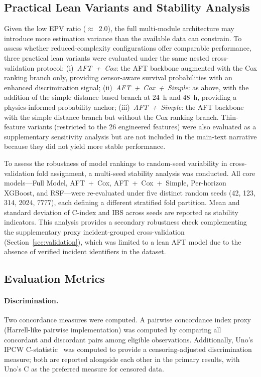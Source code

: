 \documentclass[fire,article,submit,pdftex]{../Definitions/mdpi}
\begin{document}
\subsection{Practical Lean Variants and Stability Analysis}\label{sec:lean_variants}

Given the low EPV ratio ($\approx$~2.0), the full multi-module architecture may introduce more estimation variance than the available data can constrain.
To assess whether reduced-complexity configurations offer comparable performance, three practical lean variants were evaluated under the same nested cross-validation protocol:
(i)~\emph{AFT~+~Cox}: the AFT backbone augmented with the Cox ranking branch only, providing censor-aware survival probabilities with an enhanced discrimination signal;
(ii)~\emph{AFT~+~Cox~+~Simple}: as above, with the addition of the simple distance-based branch at 24~h and 48~h, providing a physics-informed probability anchor;
(iii)~\emph{AFT~+~Simple}: the AFT backbone with the simple distance branch but without the Cox ranking branch.
Thin-feature variants (restricted to the 26 engineered features) were also evaluated as a supplementary sensitivity analysis but are not included in the main-text narrative because they did not yield more stable performance.

To assess the robustness of model rankings to random-seed variability in cross-validation fold assignment, a multi-seed stability analysis was conducted.
All core models---Full Model, AFT~+~Cox, AFT~+~Cox~+~Simple, Per-horizon XGBoost, and RSF---were re-evaluated under five distinct random seeds (42, 123, 314, 2024, 7777), each defining a different stratified fold partition.
Mean and standard deviation of C-index and IBS across seeds are reported as stability indicators.
This analysis provides a secondary robustness check complementing the supplementary proxy incident-grouped cross-validation (Section~\ref{sec:validation}), which was limited to a lean AFT model due to the absence of verified incident identifiers in the dataset.

\subsection{Evaluation Metrics}\label{sec:metrics}

\paragraph{Discrimination.}
Two concordance measures were computed.
A pairwise concordance index proxy~\cite{Harrell1996} (Harrell-like pairwise implementation) was computed by comparing all concordant and discordant pairs among eligible observations.
Additionally, Uno's IPCW C-statistic~\cite{Uno2011} was computed to provide a censoring-adjusted discrimination measure; both are reported alongside each other in the primary results, with Uno's C as the preferred measure for censored data.
\end{document}
